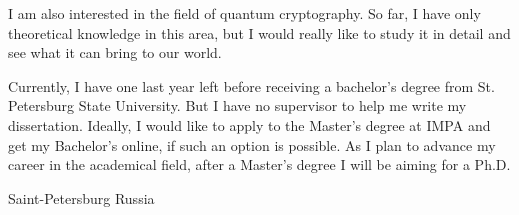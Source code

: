 \documentclass[11pt,a4paper,sans]{moderncv}        %
\begin{document}
	I am also interested in the field of quantum cryptography. So far, I have only theoretical knowledge in this area, but I would really like to study it in detail and see what it can bring to our world.
	
	Currently, I have one last year left before receiving a bachelor's degree from St. Petersburg State University. But I have no supervisor to help me write my dissertation. Ideally, I would like to apply to the Master's degree at IMPA and get my Bachelor's online, if such an option is possible. As I plan to advance my career in the academical field, after a Master's degree I will be aiming for a Ph.D.
	
	
	\title{}
	\address{Novoizmailovsky prospect, 16k8}{Saint-Petersburg}{ Russia }
	\makeletterclosing
	\name{}{}
\end{document}
